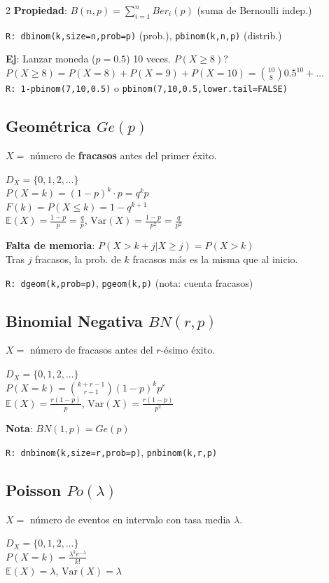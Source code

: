 \documentclass[9pt,a4paper]{article}
\newcommand{\E}{\mathbb{E}}
\newcommand{\Var}{\text{Var}}
\newcommand{\R}{\texttt{R: }}
\begin{document}
\begin{multicols}{2}
\textbf{Propiedad}: $B(n,p)=\sum_{i=1}^n Ber_i(p)$ (suma de Bernoulli indep.)

\R\texttt{dbinom(k,size=n,prob=p)} (prob.), \texttt{pbinom(k,n,p)} (distrib.)

\begin{exbox}
\textbf{Ej}: Lanzar moneda ($p=0.5$) 10 veces. $P(X\geq 8)$?\\
$P(X\geq 8)=P(X=8)+P(X=9)+P(X=10)=\binom{10}{8}0.5^{10}+\ldots$\\
\R \texttt{1-pbinom(7,10,0.5)} o \texttt{pbinom(7,10,0.5,lower.tail=FALSE)}
\end{exbox}

\subsection{Geométrica $Ge(p)$}
$X=$ número de \textbf{fracasos} antes del primer éxito.
\begin{formulabox}
$D_X=\{0,1,2,\ldots\}$\\
$P(X=k)=(1-p)^k\cdot p=q^k p$\\
$F(k)=P(X\leq k)=1-q^{k+1}$\\
$\E(X)=\frac{1-p}{p}=\frac{q}{p}$, \quad $\Var(X)=\frac{1-p}{p^2}=\frac{q}{p^2}$
\end{formulabox}

\begin{alertbox}
\textbf{Falta de memoria}: $P(X>k+j|X\geq j)=P(X>k)$\\
Tras $j$ fracasos, la prob. de $k$ fracasos más es la misma que al inicio.
\end{alertbox}

\R\texttt{dgeom(k,prob=p)}, \texttt{pgeom(k,p)} (nota: cuenta fracasos)

\subsection{Binomial Negativa $BN(r,p)$}
$X=$ número de fracasos antes del $r$-ésimo éxito.
\begin{formulabox}
$D_X=\{0,1,2,\ldots\}$\\
$P(X=k)=\binom{k+r-1}{r-1}(1-p)^k p^r$\\
$\E(X)=\frac{r(1-p)}{p}$, \quad $\Var(X)=\frac{r(1-p)}{p^2}$
\end{formulabox}

\textbf{Nota}: $BN(1,p)=Ge(p)$

\R\texttt{dnbinom(k,size=r,prob=p)}, \texttt{pnbinom(k,r,p)}

\subsection{Poisson $Po(\lambda)$}
$X=$ número de eventos en intervalo con tasa media $\lambda$.
\begin{formulabox}
$D_X=\{0,1,2,\ldots\}$\\
$P(X=k)=\frac{\lambda^k e^{-\lambda}}{k!}$\\
$\E(X)=\lambda$, \quad $\Var(X)=\lambda$
\end{formulabox}


\end{multicols}
\end{document}
